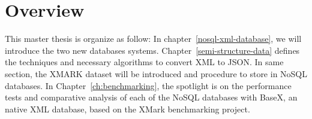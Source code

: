 		
	\section{Overview }
		This master thesis is organize as follow: In chapter~\ref{nosql-xml-database}, we will introduce the two new databases systems. Chapter~\ref{semi-structure-data} defines the techniques and necessary algorithms to convert XML  to JSON. In same section, the XMARK dataset will be introduced and procedure to store in NoSQL databases. In Chapter~\ref{ch:benchmarking}, the spotlight is on the performance tests and comparative analysis of each of the NoSQL databases with BaseX, an native XML database, based on the XMark benchmarking project.		
	